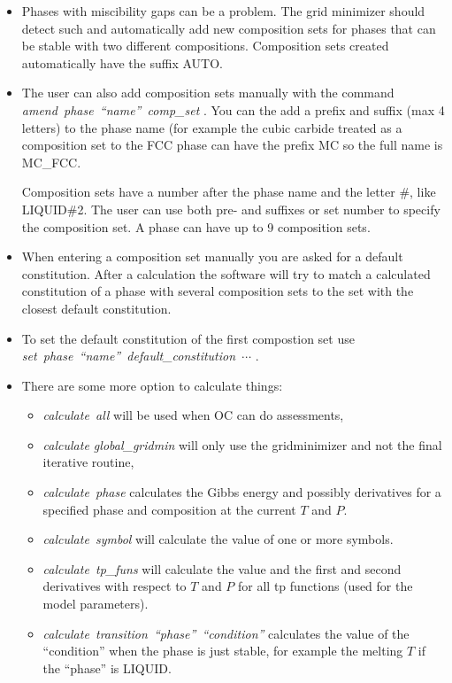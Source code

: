 \documentclass[12pt]{article}
\begin{document}
\begin{itemize}
\item Phases with miscibility gaps can be a problem.  The grid
  minimizer should detect such and automatically add new composition
  sets for phases that can be stable with two different compositions.
  Composition sets created automatically have the suffix AUTO.

\item The user can also add composition sets manually with the command
  {\em amend~phase~``name''~comp\_set }.  You can the add a prefix
  and suffix (max 4 letters) to the phase name (for example the cubic
  carbide treated as a composition set to the FCC phase can have the
  prefix MC so the full name is MC\_FCC.

  Composition sets have a number after the phase name and the letter
  \#, like LIQUID\#2.  The user can use both pre- and suffixes or set
  number to specify the composition set.  A phase can have up to 9
  composition sets.

\item When entering a composition set manually you are asked for a
  default constitution.  After a calculation the software will try to
  match a calculated constitution of a phase with several composition
  sets to the set with the closest default constitution.

\item To set the default constitution of the first compostion set use
  {\em set~phase~``name''~default\_constitution~$\cdots$ }.

\item There are some more option to calculate things:
  \begin{itemize} 
  \item {\em calculate~all} will be used when OC can do assessments,
  \item {\em calculate global\_gridmin} will only use the gridminimizer
    and not the final iterative routine,
  \item {\em calculate~phase} calculates the Gibbs energy and possibly
    derivatives for a specified phase and composition at the current $T$
    and $P$.
  \item {\em calculate~symbol} will calculate the value of one or more
    symbols.
  \item {\em calculate~tp\_funs} will calculate the value and the
    first and second derivatives with respect to $T$ and $P$ for all
    tp functions (used for the model parameters).
  \item {\em calculate~transition~``phase''~``condition''} calculates
    the value of the ``condition'' when the phase is just stable, for
    example the melting $T$ if the ``phase'' is LIQUID.
  \end{itemize}
\end{itemize}
\end{document}
